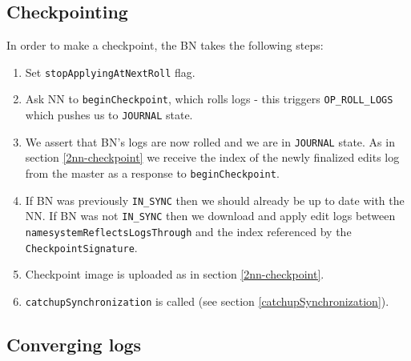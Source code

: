 \documentclass{article}
\begin{document}
\subsection{Checkpointing}

In order to make a checkpoint, the BN takes the following steps:

\begin{enumerate}
\item Set {\tt stopApplyingAtNextRoll} flag.
\item Ask NN to {\tt beginCheckpoint}, which rolls logs - this triggers {\tt OP\_ROLL\_LOGS} which pushes us to {\tt JOURNAL} state.
\item We assert that BN's logs are now rolled and we are in {\tt JOURNAL} state. As in section \ref{2nn-checkpoint} we receive the index of the newly finalized edits log from the master as a response to {\tt beginCheckpoint}.
\item If BN was previously {\tt IN\_SYNC} then we should already be up to date with the NN. If BN was not {\tt IN\_SYNC} then we download and apply edit logs between {\tt namesystemReflectsLogsThrough} and the index referenced by the {\tt CheckpointSignature}.
\item Checkpoint image is uploaded as in section \ref{2nn-checkpoint}.
\item {\tt catchupSynchronization} is called (see section \ref{catchupSynchronization}).
\end{enumerate}

\subsection{Converging logs}
\end{document}
